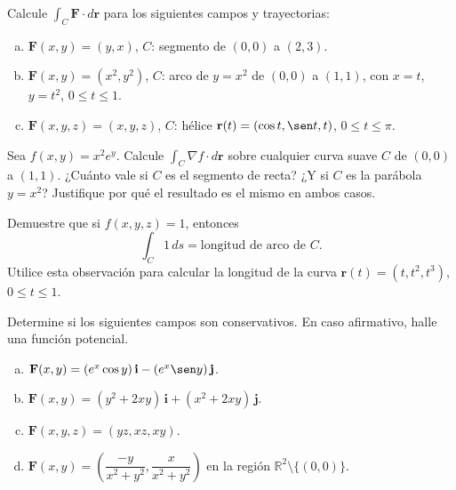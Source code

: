 \begin{prob}
Calcule \(\displaystyle\int_C \mathbf{F}\cdot d\mathbf{r}\) para los
siguientes campos y trayectorias:
\begin{enumerate}[a)]
  \item \(\mathbf{F}(x,y)=(y,x)\), \(C\): segmento de \((0,0)\) a \((2,3)\).
  \item \(\mathbf{F}(x,y)=(x^2,y^2)\), \(C\): arco de \(y=x^2\) de
  \((0,0)\) a \((1,1)\), con \(x=t\), \(y=t^2\), \(0\le t\le 1\).
  \item \(\mathbf{F}(x,y,z)=(x,y,z)\), \(C\): hélice
  \(\mathbf{r}(t)=(\cos t,\sen t,t)\), \(0\le t\le \pi\).
\end{enumerate}
\end{prob}

\begin{prob}
Sea \(f(x,y)=x^2 e^y\). Calcule \(\displaystyle\int_C \nabla f\cdot d\mathbf{r}\)
sobre cualquier curva suave \(C\) de \((0,0)\) a \((1,1)\). ¿Cuánto vale si
\(C\) es el segmento de recta? ¿Y si \(C\) es la parábola \(y=x^2\)?
Justifique por qué el resultado es el mismo en ambos casos.
\end{prob}

\begin{prob}
Demuestre que si \(f(x,y,z) = 1\), entonces
\[
\int_C 1\,ds = \text{longitud de arco de } C.
\]
Utilice esta observación para calcular la longitud de la curva
\(\mathbf{r}(t) = (t, t^2, t^3)\), \(0\le t\le 1\).
\end{prob}

\begin{prob}
Determine si los siguientes campos son conservativos. En caso
afirmativo, halle una función potencial.
\begin{enumerate}[a)]
  \item \(\mathbf{F}(x,y) = (e^x \cos y)\,\mathbf{i} - (e^x \sen y)\,\mathbf{j}\).
  \item \(\mathbf{F}(x,y) = (y^2 + 2xy)\,\mathbf{i} + (x^2 + 2xy)\,\mathbf{j}\).
  \item \(\mathbf{F}(x,y,z) = (yz, xz, xy)\).
  \item \(\mathbf{F}(x,y) = \left(\dfrac{-y}{x^2+y^2},
  \dfrac{x}{x^2+y^2}\right)\) en la región \(\mathbb{R}^2 \setminus \{(0,0)\}\).
\end{enumerate}
\end{prob}

